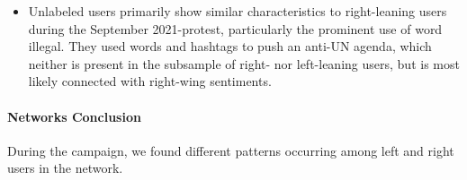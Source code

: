 \begin{itemize}
            
            
            \item 
            Unlabeled users primarily show similar characteristics to right-leaning users during the September 2021-protest, particularly the prominent use of word illegal. They used words and hashtags to push an anti-UN agenda, which neither is present in the subsample of right- nor left-leaning users, but is most likely connected with right-wing sentiments.
            
        \end{itemize}
                
        
        \paragraph{Networks Conclusion}
        
        During the campaign, we found different patterns occurring among left and right users in the network. 
        
